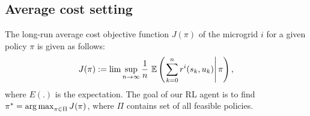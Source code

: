 \subsection{Average cost setting}
The long-run average cost objective function $J(\pi)$ of the microgrid $i$ for a given policy $\pi$ is given as follows:
\begin{align}
J(\pi) := \lim \sup_{n \rightarrow \infty}\frac{1}{n} \,\, \mathbb{E} \left(\left.\sum_{k = 0}^{n} r^{i} (s_{k},u_{k})\right|\pi \right),
\end{align}
where $E(.)$ is the expectation. The goal of our RL agent is to find $\pi^* = \mathop{\rm arg\,max}_{\pi \in \Pi} J(\pi)$, where $\Pi$ contains set of all feasible policies.

%
%

